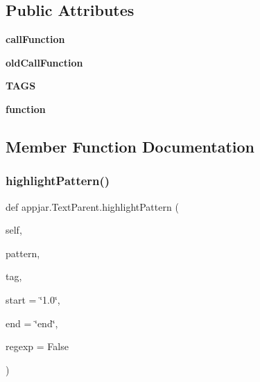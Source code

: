 \subsection*{Public Attributes}
\begin{DoxyCompactItemize}
\item 
\mbox{\label{classappjar_1_1_text_parent_a647c04786a826162fac84e64d0cb4b11}} 
{\bfseries call\+Function}
\item 
\mbox{\label{classappjar_1_1_text_parent_abbd6fd96c18e80c5e273023d107945b1}} 
{\bfseries old\+Call\+Function}
\item 
\mbox{\label{classappjar_1_1_text_parent_aaf11352870efb01685235d20968fdb42}} 
{\bfseries T\+A\+GS}
\item 
\mbox{\label{classappjar_1_1_text_parent_aafd6cd61b37d81643f4629be082fedec}} 
{\bfseries function}
\end{DoxyCompactItemize}


\subsection{Member Function Documentation}
\mbox{\label{classappjar_1_1_text_parent_a5ec475a483e2783b731cf31c6833047b}} 
\subsubsection{\texorpdfstring{highlight\+Pattern()}{highlightPattern()}}
{\footnotesize\ttfamily def appjar.\+Text\+Parent.\+highlight\+Pattern (\begin{DoxyParamCaption}\item[{}]{self,  }\item[{}]{pattern,  }\item[{}]{tag,  }\item[{}]{start = {\ttfamily \char`\"{}1.0\char`\"{}},  }\item[{}]{end = {\ttfamily \char`\"{}end\char`\"{}},  }\item[{}]{regexp = {\ttfamily False} }\end{DoxyParamCaption})}

